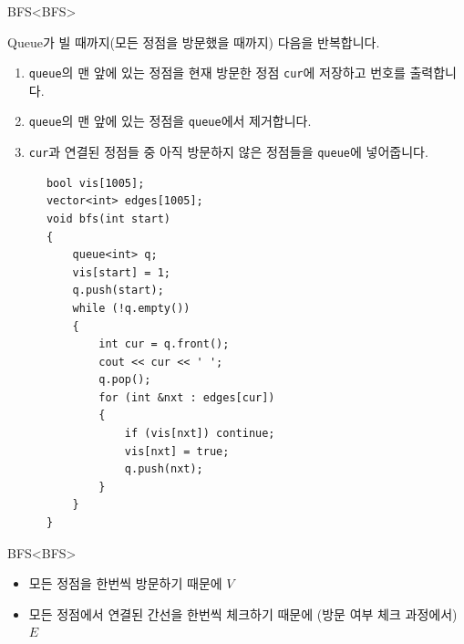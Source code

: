 \begin{frame}[fragile]{BFS}{<BFS>}
  \begin{twocol}
    \vspace{2mm}
    Queue가 빌 때까지(모든 정점을 방문했을 때까지) 다음을 반복합니다.
    \begin{enumerate}
      \item \texttt{queue}의 맨 앞에 있는 정점을 현재 방문한 정점 \texttt{cur}에 저장하고
        번호를 출력합니다.
      \item \texttt{queue}의 맨 앞에 있는 정점을 \texttt{queue}에서 제거합니다.
      \item \texttt{cur}과 연결된 정점들 중 아직 방문하지 않은 정점들을 \texttt{queue}에
        넣어줍니다.
    \end{enumerate}
  \colsplit
    \begin{verbatim}
      bool vis[1005];
      vector<int> edges[1005];
      void bfs(int start)
      {
          queue<int> q;
          vis[start] = 1;
          q.push(start);
          while (!q.empty())
          {
              int cur = q.front();
              cout << cur << ' ';
              q.pop();
              for (int &nxt : edges[cur])
              {
                  if (vis[nxt]) continue;
                  vis[nxt] = true;
                  q.push(nxt);
              }
          }
      }
    \end{verbatim}
  \end{twocol}
\end{frame}

\begin{frame}{BFS}{<BFS>}
  \vspace{8mm}
  \vspace{6mm}
  \begin{itemize}
    \item 모든 정점을 한번씩 방문하기 때문에 $V$
    \item 모든 정점에서 연결된 간선을 한번씩 체크하기 때문에 (방문 여부 체크 과정에서) $E$
  \end{itemize}
\end{frame}

